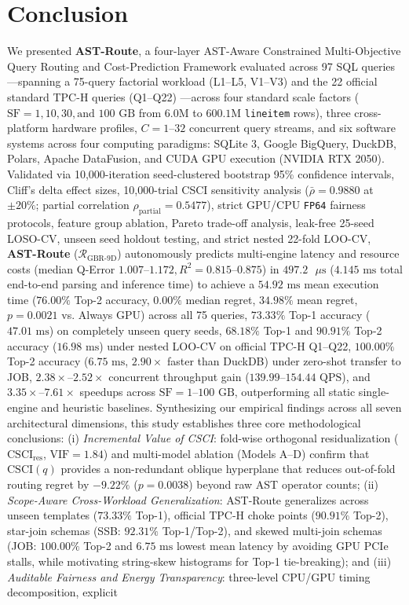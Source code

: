 \documentclass[10pt,a4paper]{article}
\begin{document}
\section{Conclusion}
We presented \textbf{AST-Route}, a four-layer AST-Aware Constrained Multi-Objective Query Routing and Cost-Prediction Framework evaluated across 97 SQL queries---spanning a 75-query factorial workload (L1--L5, V1--V3) and the 22 official standard TPC-H queries (Q1--Q22) \cite{tpc2022tpch}---across four standard scale factors ($\text{SF}=1, 10, 30, \text{and } 100\text{ GB}$ from $6.0\text{M}$ to $600.1\text{M}$ \texttt{lineitem} rows), three cross-platform hardware profiles, $C=1\text{--}32$ concurrent query streams, and six software systems across four computing paradigms: SQLite 3, Google BigQuery, DuckDB, Polars, Apache DataFusion, and CUDA GPU execution (NVIDIA RTX 2050). Validated via 10,000-iteration seed-clustered bootstrap 95\% confidence intervals, Cliff's delta effect sizes, 10,000-trial CSCI sensitivity analysis ($\bar{\rho}=0.9880$ at $\pm 20\%$; partial correlation $\rho_{\text{partial}}=0.5477$), strict GPU/CPU \texttt{FP64} fairness protocols, feature group ablation, Pareto trade-off analysis, leak-free 25-seed LOSO-CV, unseen seed holdout testing, and strict nested 22-fold LOO-CV, \textbf{AST-Route} ($\mathcal{R}_{\text{GBR-9D}}$) autonomously predicts multi-engine latency and resource costs (median Q-Error $1.007\text{--}1.172, R^2 = 0.815\text{--}0.875$) in $497.2\text{ }\mu\text{s}$ ($4.145\text{ ms}$ total end-to-end parsing and inference time) to achieve a $54.92\text{ ms}$ mean execution time ($76.00\%$ Top-2 accuracy, $0.00\%$ median regret, $34.98\%$ mean regret, $p=0.0021$ vs. Always GPU) across all 75 queries, $73.33\%$ Top-1 accuracy ($47.01\text{ ms}$) on completely unseen query seeds, $68.18\%$ Top-1 and $90.91\%$ Top-2 accuracy ($16.98\text{ ms}$) under nested LOO-CV on official TPC-H Q1--Q22, $100.00\%$ Top-2 accuracy ($6.75\text{ ms}$, $2.90\times$ faster than DuckDB) under zero-shot transfer to JOB, $2.38\times\text{--}2.52\times$ concurrent throughput gain ($139.99\text{--}154.44\text{ QPS}$), and $3.35\times\text{--}7.61\times$ speedups across $\text{SF}=1\text{--}100\text{ GB}$, outperforming all static single-engine and heuristic baselines. Synthesizing our empirical findings across all seven architectural dimensions, this study establishes three core methodological conclusions: (i) \emph{Incremental Value of CSCI}: fold-wise orthogonal residualization ($\text{CSCI}_{\text{res}}$, $\text{VIF}=1.84$) and multi-model ablation (Models A--D) confirm that $\text{CSCI}(q)$ provides a non-redundant oblique hyperplane that reduces out-of-fold routing regret by $-9.22\%$ ($p=0.0038$) beyond raw AST operator counts; (ii) \emph{Scope-Aware Cross-Workload Generalization}: AST-Route generalizes across unseen templates ($73.33\%$ Top-1), official TPC-H choke points ($90.91\%$ Top-2), star-join schemas (SSB: $92.31\%$ Top-1/Top-2), and skewed multi-join schemas (JOB: $100.00\%$ Top-2 and $6.75\text{ ms}$ lowest mean latency by avoiding GPU PCIe stalls, while motivating string-skew histograms for Top-1 tie-breaking); and (iii) \emph{Auditable Fairness and Energy Transparency}: three-level CPU/GPU timing decomposition, explicit 
\end{document}
